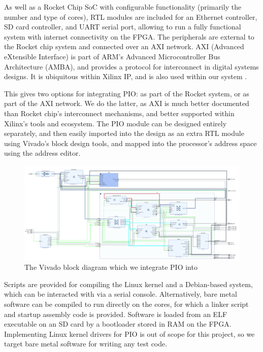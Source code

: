 As well as a Rocket Chip SoC with configurable functionality (primarily the number and type of cores), RTL modules are included for an Ethernet controller, SD card controller, and UART serial port, allowing to run a fully functional system with internet connectivity on the FPGA. The peripherals are external to the Rocket chip system and connected over an AXI network. AXI (Advanced eXtensible Interface) is part of ARM's Advanced Microcontroller Bus Architecture (AMBA), and provides a protocol for interconnect in digital systems designs. It is ubiquitous within Xilinx IP, and is also used within our system \cite{axi}.

This gives two options for integrating PIO: as part of the Rocket system, or as part of the AXI network. We do the latter, as AXI is much better documented than Rocket chip's interconnect mechanisms, and better supported within Xilinx's tools and ecosystem. The PIO module can be designed entirely separately, and then easily imported into the design as an extra RTL module using Vivado's block design tools, and mapped into the processor's address space using the address editor.

\begin{figure}[H]
    \centering
    \includegraphics[width=1.1\textwidth]{../img/block-design.png}
    \caption{The Vivado block diagram which we integrate PIO into}
    \label{fig:vivado-bd}
\end{figure}

Scripts are provided for compiling the Linux kernel and a Debian-based system, which can be interacted with via a serial console. Alternatively, bare metal software can be compiled to run directly on the cores, for which a linker script and startup assembly code is provided. Software is loaded from an ELF executable on an SD card by a bootloader stored in RAM on the FPGA. Implementing Linux kernel drivers for PIO is out of scope for this project, so we target bare metal software for writing any test code.



